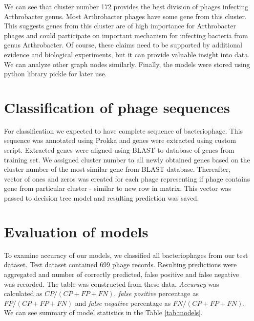 We can see that cluster number 172 provides the best division of phages infecting Arthrobacter genus.
Most Arthrobacter phages have some gene from this cluster.
This suggests genes from this cluster are of high importance for Arthrobacter phages and could participate on important mechanism for infecting bacteria from genus Arthrobacter.
Of course, these claims need to be supported by additional evidence and biological experiments, but it can provide valuable insight into data.
We can analyze other graph nodes similarly.
Finally, the models were stored using python library pickle for later use.


\section{Classification of phage sequences}
For classification we expected to have complete sequence of bacteriophage.
This sequence was annotated using Prokka and genes were extracted using custom script.
Extracted genes were aligned using BLAST to database of genes from training set.
We assigned cluster number to all newly obtained genes based on the cluster number of the most similar gene from BLAST database.
Thereafter, vector of ones and zeros was created for each phage representing if phage contains gene from particular cluster - similar to new row in matrix.
This vector was passed to decision tree model and resulting prediction was saved.

\section{Evaluation of models}
To examine accuracy of our models, we classified all bacteriophages from our test dataset.
Test dataset contained 699 phage records.
Resulting predictions were aggregated and number of correctly predicted, false positive and false negative was recorded.
The table was constructed from these data.
\emph{Accuracy} was calculated as $CP/(CP+FP+FN)$, \emph{false positive} percentage as $FP/(CP+FP+FN)$ and \emph{false negative} percentage as $FN/(CP+FP+FN)$.
We can see summary of model statistics in the Table \ref{tab:models}. 

